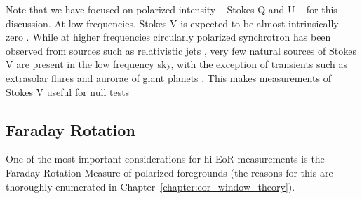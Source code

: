 Note that we have focused on polarized intensity -- Stokes Q and U -- for this discussion.
At low frequencies, Stokes V is expected to be almost intrinsically zero \citep[e.g.][]{Sokolowski.17}. While at higher frequencies circularly polarized synchrotron has been observed from sources such as relativistic jets \citep[e.g.][]{Macquart.04}, very few natural sources of Stokes V are present in the low frequency sky, with the exception of transients such as extrasolar flares \citep{Spreeuw.10} and aurorae of giant planets \citep[e.g.][]{Zarka.05, Badman.15}. This makes measurements of Stokes V useful for null tests \citep[e.g.][]{Patil.17}

\subsection{Faraday Rotation}

One of the most important considerations for {\sc hi} EoR measurements is the Faraday Rotation Measure of polarized foregrounds (the reasons for this are thoroughly enumerated in Chapter~\ref{chapter:eor_window_theory}). 

